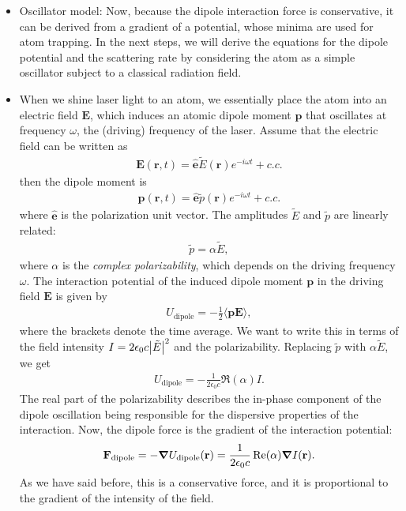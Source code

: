 \documentclass{book}
\theoremstyle{definition}
\begin{document}
\begin{itemize}
\begin{itemize}
		
		\item Oscillator model: Now, because the dipole interaction force is conservative, it can be derived from a gradient of a potential, whose minima are used for atom trapping. In the next steps, we will derive the equations for the dipole potential and the scattering rate by considering the atom as a simple oscillator subject to a classical radiation field. 
		
		
		\item When we shine laser light to an atom, we essentially place the atom into an electric field $\textbf{E}$, which induces an atomic dipole moment $\textbf{p}$ that oscillates at frequency $\omega$, the (driving) frequency of the laser. Assume that the electric field can be written as
		\begin{align}
		\textbf{E}(\textbf{r},t) = \mathbf{\hat{e}}\tilde{E}(\textbf{r})e^{-i\omega t} + c.c.
		\end{align}
		then the dipole moment is
		\begin{align}
		\textbf{p}(\textbf{r},t) = \mathbf{\hat{e}}\tilde{p}(\textbf{r})e^{-i\omega t} + c.c.
		\end{align}
		where $\mathbf{\hat{e}}$ is the polarization unit vector. The amplitudes $\tilde{E}$ and $\tilde{p}$ are linearly related:
		\begin{align}
		\tilde{p} = \alpha \tilde{E},
		\end{align}
		where $\alpha$ is the \textit{complex polarizability}, which depends on the driving frequency $\omega$. The interaction potential of the induced dipole moment $\textbf{p}$ in the driving field $\textbf{E}$ is given by
		\begin{align}
		U_{\text{dipole}} = -\frac{1}{2}\langle \textbf{pE} \rangle,
		\end{align}
		where the brackets denote the time average. We want to write this in terms of the field intensity $I = 2\epsilon_0 c\abs{\tilde{E}}^2$ and the polarizability. Replacing $\tilde{p}$ with $\alpha\tilde{E}$, we get
		\begin{align}
		U_{\text{dipole}} = -\frac{1}{2\epsilon_0 c}\Re(\alpha) I.
		\end{align}
		The real part of the polarizability describes the in-phase component of the dipole oscillation being responsible for the dispersive properties of the interaction. Now, the dipole force is the gradient of the interaction potential:
		\begin{align}
		\textbf{F}_\text{dipole} = -\grad{U_\text{dipole}}(\textbf{r}) = \frac{1}{2\epsilon_0 c}\Re(\alpha)\grad{I}(\textbf{r}).
		\end{align}
		As we have said before, this is a conservative force, and it is proportional to the gradient of the intensity of the field. 
		

\end{itemize}
\end{itemize}
\end{document}

